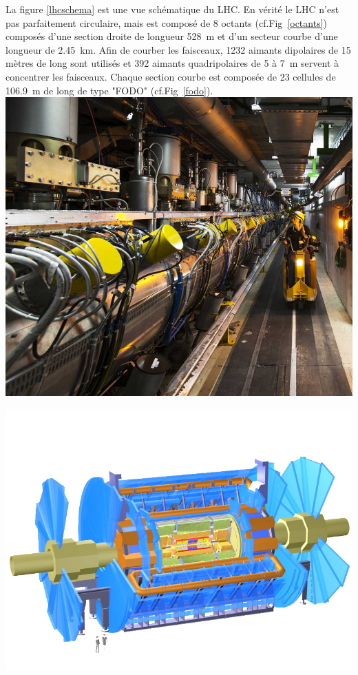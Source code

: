 La figure \ref{lhcschema} est une vue schématique du LHC. En vérité le LHC n'est pas parfaitement circulaire, mais est composé de \num{8} octants (cf.Fig~\ref{octants}) composés d'une section droite de longueur \SI{528}{\meter} et d'un secteur courbe d'une longueur de \SI{2.45}{\kilo\meter}. Afin de courber les faisceaux, \num{1232} aimants dipolaires de \num{15} mètres de long sont utilisés et \num{392} aimants quadripolaires de \num{5} à \SI{7}{\meter} servent à concentrer les faisceaux. Chaque section courbe est composée de \num{23} cellules de \SI{106.9}{\meter} de long de type "FODO" (cf.Fig~\ref{fodo}).
\marginpar
{
	\includegraphics[width=\marginparwidth]{LHC/RF.jpg}
	\label{radio}
}

\marginpar
{
	\includegraphics[width=\marginparwidth]{LHC/atlas.png}
	\label{atlas}
}

